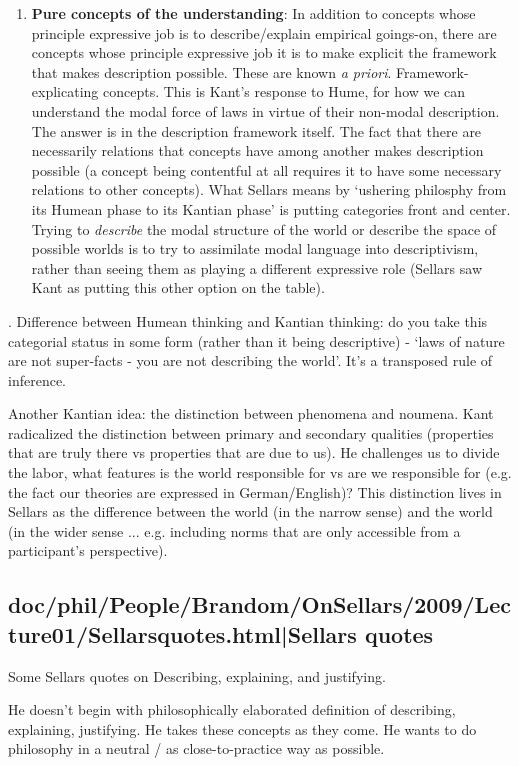 \documentclass[12pt,a4paper]{report}
\begin{document}
\begin{enumerate}
\item \textbf{Pure concepts of the understanding}: In addition to concepts whose principle expressive job is to describe/explain empirical goings-on, there are concepts whose principle expressive job it is to make explicit the framework that makes description possible. These are known \textit{a priori}. Framework-explicating concepts. This is Kant's response to Hume, for how we can understand the modal force of laws in virtue of their non-modal description. The answer is in the description framework itself. The fact that there are necessarily relations that concepts have among another makes description possible (a concept being contentful at all requires it to have some necessary relations to other concepts). What Sellars means by `ushering philosphy from its Humean phase to its Kantian phase' is putting categories front and center. Trying to \emph{describe} the modal structure of the world or describe the space of possible worlds is to try to assimilate modal language into descriptivism, rather than seeing them as playing a different expressive role (Sellars saw Kant as putting this other option on the table).
\end{enumerate}. Difference between Humean thinking and Kantian thinking: do you take this categorial status in some form (rather than it being descriptive) - `laws of nature are not super-facts - you are not describing the world'. It's a transposed rule of inference.

Another Kantian idea: the distinction between phenomena and noumena. Kant radicalized the distinction between primary and secondary qualities (properties that are truly there vs properties that are due to us). He challenges us to divide the labor, what features is the world responsible for vs are we responsible for (e.g. the fact our theories are expressed in German/English)? This distinction lives in Sellars as the difference between the world (in the narrow sense) and the world (in the wider sense ... e.g. including norms that are only accessible from a participant's perspective).

\subsection{doc/phil/People/Brandom/OnSellars/2009/Lecture01/Sellarsquotes.html|Sellars quotes}
Some Sellars quotes on Describing, explaining, and justifying.

He doesn't begin with philosophically elaborated definition of describing, explaining, justifying. He takes these concepts as they come. He wants to do philosophy in a neutral / as close-to-practice way as possible.
\end{document}
